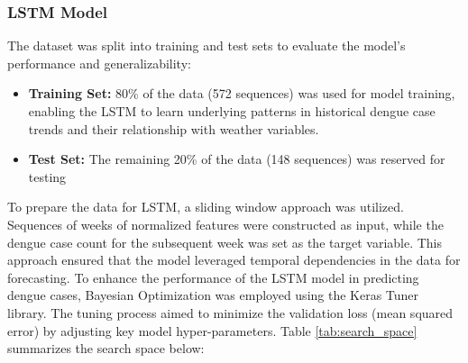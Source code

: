 \subsubsection{LSTM Model}
The dataset was split into training and test sets to evaluate the model’s performance and generalizability:
\begin{itemize}
	\item \textbf{Training Set:} 80\% of the data (572 sequences) was used for model training, enabling the LSTM to learn underlying patterns in historical dengue case trends and their relationship with weather variables.
	\item \textbf{Test Set:} The remaining 20\% of the data (148 sequences) was reserved for testing
\end{itemize}

To prepare the data for LSTM, a sliding window approach was utilized. Sequences of weeks of normalized features were constructed as input, while the dengue case count for the subsequent week was set as the target variable. This approach ensured that the model leveraged temporal dependencies in the data for forecasting. To enhance the performance of the LSTM model in predicting dengue cases, Bayesian Optimization was employed using the Keras Tuner library. The tuning process aimed to minimize the validation loss (mean squared error) by adjusting key model hyper-parameters. Table \ref{tab:search_space} summarizes the search space below:

\begin{table}[h!]
	\centering
	\caption{Hyperparameter Tuning: Search Space and Tuner Configuration}
	\label{tab:search_space}
\end{table}

